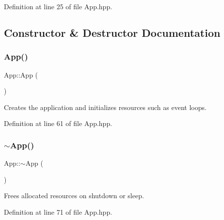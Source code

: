 Definition at line 25 of file App.\+hpp.



\subsection{Constructor \& Destructor Documentation}
\mbox{\label{classApp_acb8cbf3e285b91d0170ffe87df5989c5}} 
\subsubsection{\texorpdfstring{App()}{App()}}
{\footnotesize\ttfamily App\+::\+App (\begin{DoxyParamCaption}{ }\end{DoxyParamCaption})\hspace{0.3cm}{\ttfamily [inline]}}

Creates the application and initializes resources such as event loops. 

Definition at line 61 of file App.\+hpp.


\begin{DoxyCode}{0}

\end{DoxyCode}
\mbox{\label{classApp_a34f1f253b1cef5f4ecbac66eaf6964ec}} 
\subsubsection{\texorpdfstring{$\sim$App()}{~App()}}
{\footnotesize\ttfamily App\+::$\sim$\+App (\begin{DoxyParamCaption}{ }\end{DoxyParamCaption})\hspace{0.3cm}{\ttfamily [inline]}}

Frees allocated resources on shutdown or sleep. 

Definition at line 71 of file App.\+hpp.


